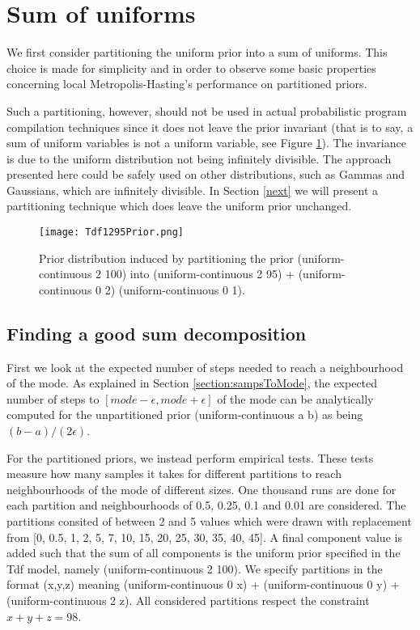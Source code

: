 \section{Sum of uniforms}

We first consider partitioning the uniform prior into a sum of uniforms. This choice is made for simplicity and in order to observe some basic properties concerning local Metropolis-Hasting's performance on partitioned priors.

Such a partitioning, however, should not be used in actual probabilistic program compilation techniques since it does not leave the prior invariant (that is to say, a sum of uniform variables is not a uniform variable, see Figure \ref{fig:1295Prior}). The invariance is due to the uniform distribution not being infinitely divisible. The approach presented here could be safely used on other distributions, such as Gammas and Gaussians, which are infinitely divisible. In Section \ref{next} we will present a partitioning technique which does leave the uniform prior unchanged.

\begin{figure}[H]
    \centering
    \texttt{[image: Tdf1295Prior.png]}
    \caption{Prior distribution induced by partitioning the prior (uniform-continuous 2 100) into (uniform-continuous 2 95) + (uniform-continuous 0 2) (uniform-continuous 0 1).}
    \label{fig:1295Prior}
\end{figure}

\subsection{Finding a good sum decomposition}

First we look at the expected number of steps needed to reach a neighbourhood of the mode. As explained in Section \ref{section:sampsToMode}, the expected number of steps to $[mode - \epsilon, mode + \epsilon]$ of the mode can be analytically computed for the unpartitioned prior (uniform-continuous a b) as being $(b-a)/(2\epsilon)$.

For the partitioned priors, we instead perform empirical tests. These tests measure how many samples it takes for different partitions to reach neighbourhoods of the mode of different sizes. One thousand runs are done for each partition and neighbourhoods of 0.5, 0.25, 0.1 and 0.01 are considered. The partitions consited of between 2 and 5 values which were drawn with replacement from [0, 0.5, 1, 2, 5, 7, 10, 15, 20, 25, 30, 35, 40, 45]. A final component value is added such that the sum of all components is the uniform prior specified in the Tdf model, namely (uniform-continuous 2 100). We specify partitions in the format (x,y,z) meaning (uniform-continuous 0 x) + (uniform-continuous 0 y) + (uniform-continuous 2 z). All considered partitions respect the constraint $x+y+z = 98$.

